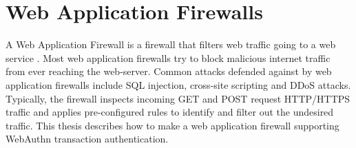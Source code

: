 \section{Web Application Firewalls}

A Web Application Firewall is a firewall that filters web traffic going to a web service \cite{web-application-firewall}. Most web application firewalls try to block malicious internet traffic from ever reaching the web-server. Common attacks defended against by web application firewalls include SQL injection, cross-site scripting and DDoS attacks. Typically, the firewall inspects incoming GET and POST request HTTP/HTTPS traffic and applies pre-configured rules to identify and filter out the undesired traffic. This thesis describes how to make a web application firewall supporting WebAuthn transaction authentication.






